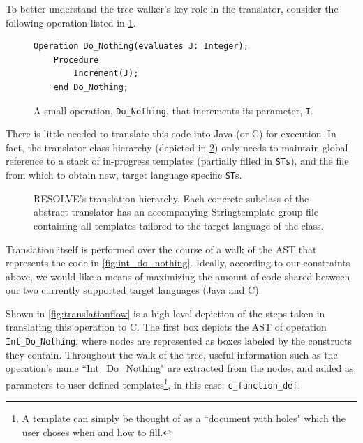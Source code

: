 \documentclass[times]{speauth}
\begin{document}
To better understand the tree walker's key role in the translator, consider the following operation listed in \ref{fig:do_nothing}.

\begin{figure}[!htb]
\centering
\begin{minipage}{.80\textwidth}
\begin{lstlisting}
Operation Do_Nothing(evaluates J: Integer);
	Procedure
		Increment(J);
	end Do_Nothing;
\end{lstlisting}
\end{minipage}
\caption{A small operation, \texttt{Do\_Nothing}, that increments its parameter, \texttt{I}.}
\label{fig:do_nothing}
\end{figure}

There is little needed to translate this code into Java (or C) for execution. In fact, the translator class hierarchy (depicted in \ref{fig:translation_uml}) only needs to maintain global reference to a stack of in-progress templates (partially filled in \texttt{STs}), and the file from which to obtain new, target language specific \texttt{ST}s.

\begin{figure}[!htb]
\centering
\caption{RESOLVE's translation hierarchy. Each concrete subclass of the abstract translator has an accompanying Stringtemplate group file containing all templates tailored to the target language of the class.}
\label{fig:translation_uml}
\end{figure}

Translation itself is performed over the course of a walk of the AST that represents the code in \ref{fig:int_do_nothing}. Ideally, according to our constraints above, we would like a means of maximizing the amount of code shared between our two currently supported target languages (Java and C). 

Shown in \ref{fig:translationflow} is a high level depiction of the steps taken in translating this operation to C. The first box depicts the AST of operation \texttt{Int\_Do\_Nothing}, where nodes are represented as boxes labeled by the constructs they contain. Throughout the walk of the tree, useful information such as the operation's name ``Int\_Do\_Nothing" are extracted from the nodes, and added as parameters to user defined templates\footnote{A template can simply be thought of as a ``document with holes" which the user choses when and how to fill.}, in this case: \texttt{c\_function\_def}.
\end{document}
